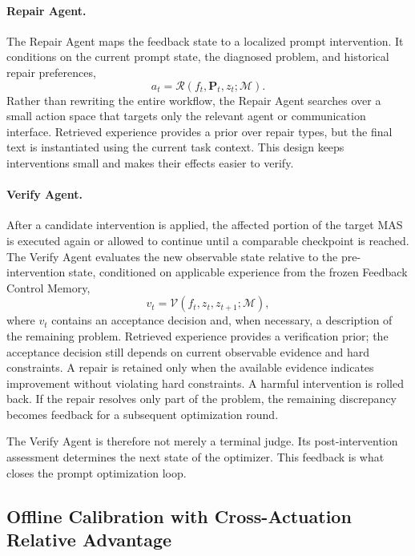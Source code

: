 \paragraph{\textbf{Repair Agent.}}
The Repair Agent maps the feedback state to a localized prompt intervention.
It conditions on the current prompt state, the diagnosed problem, and historical repair preferences,
\begin{equation}
    a_t =
    \mathcal{R}
    \left(
        f_t,\mathbf{P}_t,z_t;\mathcal{M}
    \right).
    \label{eq:repair}
\end{equation}
Rather than rewriting the entire workflow, the Repair Agent searches over a small action space that targets only the relevant agent or communication interface.
Retrieved experience provides a prior over repair types, but the final text is instantiated using the current task context.
This design keeps interventions small and makes their effects easier to verify.

\paragraph{\textbf{Verify Agent.}}
After a candidate intervention is applied, the affected portion of the target MAS is executed again or allowed to continue until a comparable checkpoint is reached.
The Verify Agent evaluates the new observable state relative to the pre-intervention state, conditioned on applicable experience from the frozen Feedback Control Memory,
\begin{equation}
    v_t =
    \mathcal{V}
    \left(
        f_t,z_t,z_{t+1};\mathcal{M}
    \right),
    \label{eq:verify}
\end{equation}
where $v_t$ contains an acceptance decision and, when necessary, a description of the remaining problem.
Retrieved experience provides a verification prior; the acceptance decision still depends on current observable evidence and hard constraints.
A repair is retained only when the available evidence indicates improvement without violating hard constraints.
A harmful intervention is rolled back.
If the repair resolves only part of the problem, the remaining discrepancy becomes feedback for a subsequent optimization round.

The Verify Agent is therefore not merely a terminal judge.
Its post-intervention assessment determines the next state of the optimizer.
This feedback is what closes the prompt optimization loop.


\subsection{Offline Calibration with Cross-Actuation Relative Advantage}
\label{sec:cara}

